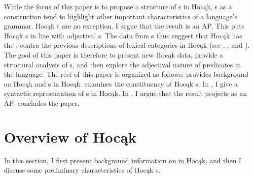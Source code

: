 \documentclass[output=paper]{LSP/langsci}
\begin{document}
\begin{exe}
\ex\label{ex:rosen:2}
{\hspace{1em}}\newline
{}
\end{exe}

While the focus of this paper is to propose a structure of s in Hocąk, s as a construction tend to highlight other important characteristics of a language's grammar. Hocąk s are no exception. I argue that the result  is an AP. This puts Hocąk s in line with  adjectival s. The data from s
thus suggest that Hocąk has the  , contra the previous descriptions of lexical categories in Hocąk (see \citealt{Lipkind1945}, \citealt{Susman1943}, and \citealt{Helmbrecht2006b}). The goal of this paper is therefore to present new Hocąk data, provide a structural analysis of s, and then explore the adjectival nature of  predicates in the language. The rest of this paper is organized as follows:  provides background on Hocąk  and s in Hocąk.  examines the constituency of Hocąk s. In , I give a syntactic representation of s in Hocąk. In , I argue that the result  projects as an AP.  concludes the paper.

\section{Overview of Hocąk }\label{sec:rosen:2}

In this section, I first present background information on  in Hocąk, and then I discuss some preliminary characteristics of Hocąk s.
\end{document}

